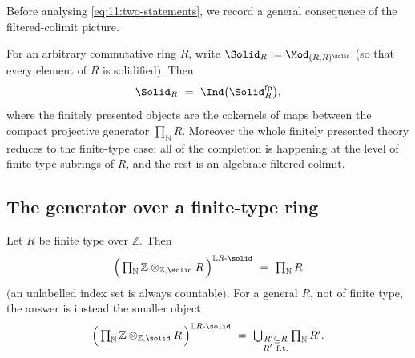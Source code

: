 Before analysing \eqref{eq:11:two-statements}, we record a general
consequence of the filtered-colimit picture.

\begin{corollary}
\label{cor:11:completion-finite-type}
For an arbitrary commutative ring $R$, write $\Solid_{R}:=\Mod_{(R,R)^{\solid}}$
(so that every element of $R$ is solidified). Then
\begin{equation*}
\Solid_{R}\ =\ \Ind\bigl(\Solid_{R}^{\mathrm{fp}}\bigr),
\end{equation*}
where the finitely presented objects are the cokernels of maps between the
compact projective generator $\prod_{\mathbb{N}}R$. Moreover the whole
finitely presented theory reduces to the finite-type case: all of the
completion is happening at the level of finite-type subrings of $R$, and the
rest is an algebraic filtered colimit.
\end{corollary}

\subsection{The generator over a finite-type ring}

\begin{proposition}
\label{prop:11:generator}
Let $R$ be finite type over $\mathbb{Z}$. Then
\begin{equation*}
\Bigl(\,\textstyle\prod_{\mathbb{N}}\mathbb{Z}\otimes_{\mathbb{Z},\solid}R\,
\Bigr)^{\mathbb{L}R\text{-}\solid}\ =\ \textstyle\prod_{\mathbb{N}}R
\end{equation*}
$($an unlabelled index set is always countable$)$. For a general $R$, not of
finite type, the answer is instead the smaller object
\begin{equation*}
\Bigl(\,\textstyle\prod_{\mathbb{N}}\mathbb{Z}\otimes_{\mathbb{Z},\solid}R\,
\Bigr)^{\mathbb{L}R\text{-}\solid}\ =\ \bigcup_{\substack{R'\subseteq R\\ R'\
\mathrm{f.t.}}} \textstyle\prod_{\mathbb{N}}R'.
\end{equation*}
\end{proposition}

